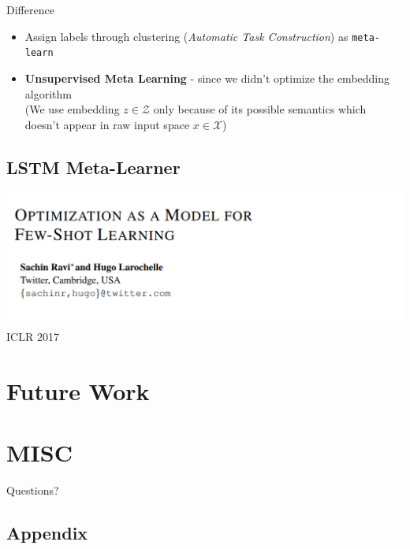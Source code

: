 \documentclass{beamer}
\newcommand{\weib}{\CJKfamily{weib}}
\begin{document}
\begin{frame}{Difference}
  \begin{itemize}
    \item Assign labels through clustering (\textit{Automatic Task Construction}) as \texttt{meta-learn}
    \item \textbf{Unsupervised Meta Learning} - since we didn't optimize the embedding algorithm \\
      (We use embedding $z \in \mathcal{Z}$ only because of its possible semantics which doesn't appear in raw input space $x \in \mathcal{X}$)
  \end{itemize}
\end{frame}

\subsection{LSTM Meta-Learner}
\begin{frame}
  \includegraphics[width=\textwidth]{fig/LSTM-Meta-Learner.png}
  \center ICLR 2017
\end{frame}

\section{Future Work}

\section{MISC}
\begin{frame}
	\begin{center}
    \LARGE{Questions?}
	\end{center}
\end{frame}


\subsection{Appendix}
\end{document}
